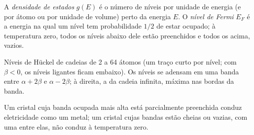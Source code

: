 \begin{definition}\label{def:b3:solid-state:fermi}
A \emph{densidade de estados} $g(E)$ é o número de
níveis por unidade de energia (e por átomo ou por unidade de volume) perto da energia $E$.
O \emph{nível de Fermi} $E_F$ é a energia na qual um nível tem
probabilidade $1/2$ de estar ocupado; à temperatura zero, todos os níveis abaixo dele estão
preenchidos e todos os acima, vazios.
\end{definition}

\begin{omfigure}

{\small Níveis de Hückel de cadeias de 2 a 64 átomos (um traço curto por nível;
com $\beta < 0$, os níveis ligantes ficam embaixo). Os níveis se adensam em uma banda
entre $\alpha + 2\beta$ e $\alpha - 2\beta$; à direita, a  da cadeia
infinita, máxima nas bordas da banda.}
\end{omfigure}

\begin{proposition}\label{prop:b3:solid-state:filling}
Um cristal cuja banda ocupada mais alta está parcialmente preenchida conduz eletricidade
como um metal; um cristal cujas bandas estão cheias ou vazias, com uma 
entre elas, não conduz à temperatura zero.
\end{proposition}

